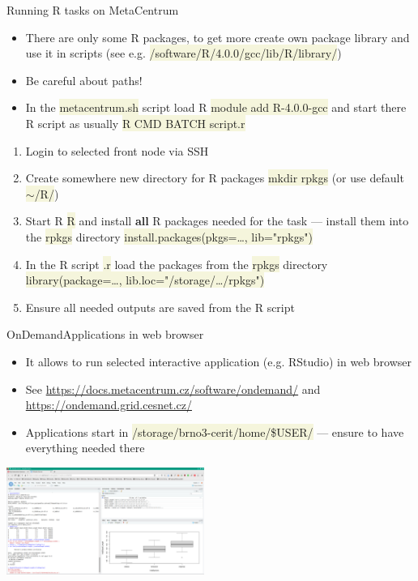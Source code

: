 \documentclass[compress, xelatex, 11pt, xcolor=svgnames, aspectratio=169,
	hyperref={
		bookmarks=true,
		unicode=true,
		colorlinks=true,
		pdftitle={Molecular data in R},
		plainpages=false,
		pdfauthor={Vojtech Zeisek},
		pdfsubject={Course about phylogeny and evolution in R},
		pdfcreator={XeLaTeX},
		pdfkeywords={R, evolution, phylogeny, molecular data},
		linkcolor=Crimson, %
		anchorcolor=Magenta, %
		citecolor=Magenta, %
		filecolor=Magenta, %
		menucolor=Magenta, %
		urlcolor=DodgerBlue, %
		},
	url={hyphens, lowtilde} %
	]{beamer}
\renewcommand{\texttt}[1]{\colorbox{Beige}{{\ttfamily #1}}}
\begin{document}
\begin{frame}{Running R tasks on MetaCentrum}
	\begin{itemize}
		\item There are only some R packages, to get more create own package library and use it in scripts (see e.g. \texttt{/software/R/4.0.0/gcc/lib/R/library/})
		\item \alert{Be careful about paths!}
		\item In the \texttt{metacentrum.sh} script load R \texttt{module add R-4.0.0-gcc} and start there R script as usually \texttt{R CMD BATCH script.r}
	\end{itemize}
	\begin{enumerate}
		\item Login to selected front node via SSH
		\item Create somewhere new directory for R packages \texttt{mkdir rpkgs} (or use default \texttt{$\sim$/R/})
		\item Start R \texttt{R} and install \textbf{all} R packages needed for the task --- install them into the \texttt{rpkgs} directory \texttt{install.packages(pkgs=\ldots, lib="rpkgs")}
		\item In the R script \texttt{*.r} load the packages from the \texttt{rpkgs} directory \texttt{library(package=\ldots, lib.loc="/storage/\ldots/rpkgs")}
		\item Ensure all needed outputs are saved from the R script
	\end{enumerate}
\end{frame}

\begin{frame}{OnDemand}{Applications in web browser}
	\begin{itemize}
		\item It allows to run selected interactive application (e.g. RStudio) in web browser
		\item See \url{https://docs.metacentrum.cz/software/ondemand/} and \url{https://ondemand.grid.cesnet.cz/}
		\item Applications start in \texttt{/storage/brno3-cerit/home/\$USER/} --- ensure to have everything needed there
	\end{itemize}
	\begin{center}
		\includegraphics[height=3.5cm]{rstudio_ondemand.png}
	\end{center}
\end{frame}
\end{document}
